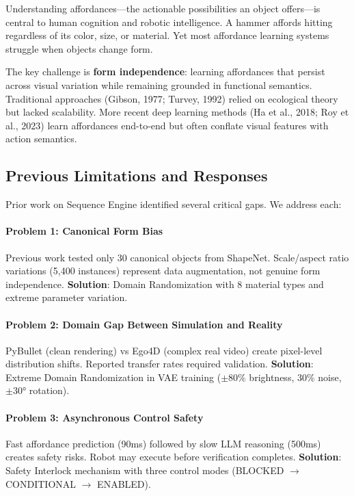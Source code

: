 \documentclass[11pt]{article}
\begin{document}
Understanding affordances---the actionable possibilities an object offers---is central to human cognition and robotic intelligence. A hammer affords hitting regardless of its color, size, or material. Yet most affordance learning systems struggle when objects change form.

The key challenge is \textbf{form independence}: learning affordances that persist across visual variation while remaining grounded in functional semantics. Traditional approaches (Gibson, 1977; Turvey, 1992) relied on ecological theory but lacked scalability. More recent deep learning methods (Ha et al., 2018; Roy et al., 2023) learn affordances end-to-end but often conflate visual features with action semantics.

\subsection{Previous Limitations and Responses}

Prior work on Sequence Engine identified several critical gaps. We address each:

\paragraph{Problem 1: Canonical Form Bias}
Previous work tested only 30 canonical objects from ShapeNet. Scale/aspect ratio variations (5,400 instances) represent data augmentation, not genuine form independence.
\textbf{Solution}: Domain Randomization with 8 material types and extreme parameter variation.

\paragraph{Problem 2: Domain Gap Between Simulation and Reality}
PyBullet (clean rendering) vs Ego4D (complex real video) create pixel-level distribution shifts. Reported transfer rates required validation.
\textbf{Solution}: Extreme Domain Randomization in VAE training ($\pm 80\%$ brightness, 30\% noise, $\pm 30°$ rotation).

\paragraph{Problem 3: Asynchronous Control Safety}
Fast affordance prediction (90ms) followed by slow LLM reasoning (500ms) creates safety risks. Robot may execute before verification completes.
\textbf{Solution}: Safety Interlock mechanism with three control modes (BLOCKED $\to$ CONDITIONAL $\to$ ENABLED).
\end{document}
